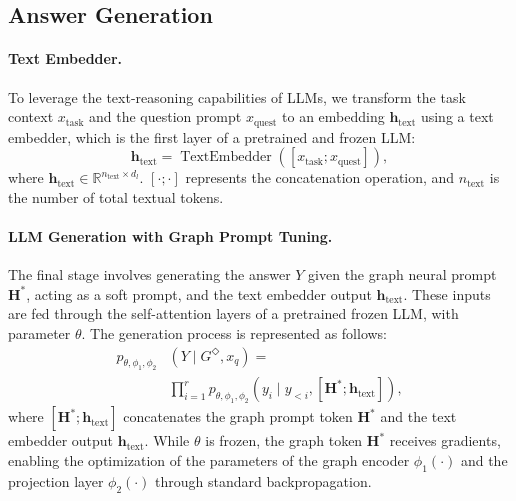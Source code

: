 \documentclass[11pt]{article}
\begin{document}
\subsection{Answer Generation}
\paragraph{Text Embedder.}  To leverage the text-reasoning capabilities of LLMs, we transform the task context $x_{\mathrm{task}}$ and the question prompt $x_{\mathrm{quest}}$ to an embedding $\mathbf{h}_{\text{text}}$ using a text embedder, which is the first layer of a pretrained and frozen LLM:
\begin{equation}
\mathbf{h}_{\text{text}}=\operatorname{TextEmbedder}\left(\left[x_{\mathrm{task}} ; x_{\mathrm{quest}}\right]\right),
\end{equation}
where $\mathbf{h}_{\text{text}}\in \mathbb{R}^{n_{\text{text}} \times d_l}$. $[\cdot;\cdot]$ represents the concatenation operation, and $n_{\text{text}}$ is the number of total textual tokens.

\paragraph{LLM Generation with Graph Prompt Tuning.} The final stage involves generating the answer $Y$ given the graph neural prompt $\mathbf{H}^*$, acting as a soft prompt, and the text embedder output $\mathbf{h}_{\text{text}}$. These inputs are fed through the self-attention layers of a pretrained frozen LLM, with parameter $\theta$. The generation process is represented as follows:
\begin{equation}
\begin{split}
    p_{\theta, \phi_1, \phi_2}&\left(Y \mid G^\Diamond, x_q\right)= \\
    &\prod_{i=1}^r p_{\theta, \phi_1, \phi_2}\left(y_i \mid y_{<i},\left[{\mathbf{H}}^* ; \mathbf{h}_{\text{text}}\right]\right),
\end{split}
\end{equation}
where $\left[\mathbf{H}^* ; \mathbf{h}_{\text{text}}\right]$ concatenates the graph prompt token $\mathbf{H}^*$ and the text embedder output $\mathbf{h}_{\text{text}}$. While $\theta$ is frozen, the graph token $\mathbf{H}^*$ receives gradients, enabling the optimization of the parameters of the graph encoder $\phi_1(\cdot)$ and the projection layer $\phi_2(\cdot)$ through standard backpropagation.
\end{document}

